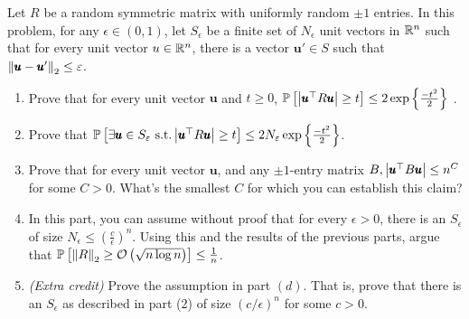 \newpage
\pb
Let $R$ be a random symmetric matrix with uniformly random $\pm1$ entries. In this problem, for any $\epsilon\in(0,1)$, let $S_{\epsilon}$ be a finite set of $N_{\epsilon}$ unit vectors in $\mathbb{R}^{n}$ such that for every unit vector $u\in \mathbb{R}^{n}$, there is a vector $\pmb u'\in S$ such that $\left\lVert \pmb u-\pmb u' \right\rVert_{2} \le\varepsilon$.
\begin{enumerate}[leftmargin=*, label=(\alph*)]
\item Prove that for every unit vector $\pmb u$ and $t\ge 0$, $\mathbb P\left[ \left| \pmb u^{\top} R\pmb u \right|\ge t \right] \le 2\exp\left\{\frac{-t^{2}}{2}\right\}$ .
\item Prove that $\mathbb P\left[ \exists\pmb u\in S_{\varepsilon} \text{ s.t.} \left| \pmb u^{\top}R\pmb u \right|\ge t \right] \le 2N_{\varepsilon}\exp\left\{\frac{-t^{2}}{2}\right\}$.
\item Prove that for every unit vector $\pmb u$, and any $\pm1$-entry matrix $B, \left| \pmb u^{\top}B\pmb u \right|\le n^{C}$ for some $C >0$. What's the smallest $C$ for which you can establish this claim?
\item In this part, you can assume without proof that for every $\epsilon>0$, there is an $S_{\epsilon}$ of size $N_{\epsilon} \le \left(\frac{c}{\epsilon}\right)^{n}$. Using this and the results of the previous parts, argue that $\mathbb P\left[ \left\lVert R \right\rVert_{2} \ge {\mathcal{O}}\left(\sqrt{n\log n}\right) \right] \le \frac{1}{n}$.
\item \textit{(Extra credit)} Prove the assumption in part $(d)$. That is, prove that there is an $S_{\epsilon}$ as described in part (2) of size $(c/\epsilon)^{n}$ for some $c>0$.
\end{enumerate}

\soln

